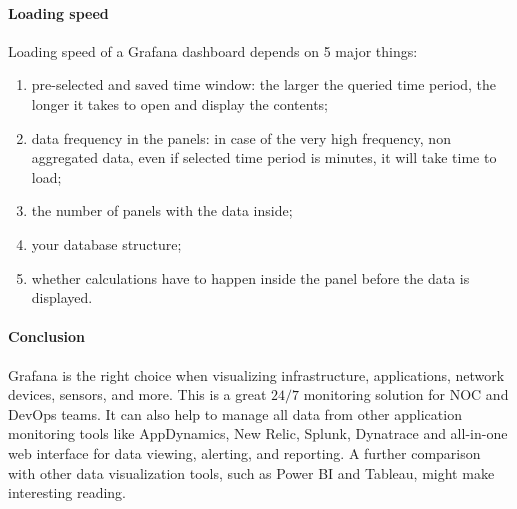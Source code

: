 \paragraph{Loading speed}
Loading speed of a Grafana dashboard depends on 5 major things:
\begin{enumerate}
    \item  pre-selected and saved time window: the larger the queried time period, the longer it takes to open and display the contents;
    \item  data frequency in the panels: in case of the very high frequency, non aggregated data, even if selected time period is minutes, it will take time to load;
    \item  the number of panels with the data inside;
    \item  your database structure;
    \item  whether calculations have to happen inside the panel before the data is displayed.
\end{enumerate}

\paragraph{Conclusion}
Grafana is the right choice when visualizing infrastructure, applications, network devices, sensors, and more. This is a great $24/7$ monitoring solution for NOC and DevOps teams.
It can also help to manage all data from other application monitoring tools like AppDynamics, New Relic, Splunk, Dynatrace and all-in-one web interface for data viewing, alerting, and reporting.
A further comparison with other data visualization tools, such as Power BI and Tableau, might make interesting reading.



